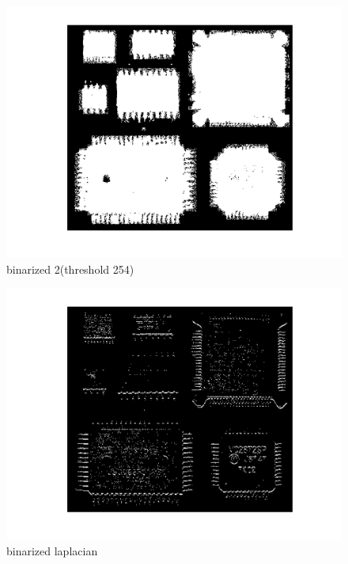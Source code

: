 \documentclass[twocolumn,oneside,a4paper]{article}
\begin{document}
\begin{figure}[htbp]
    \includegraphics[bb=0 0 576 432,width=1\columnwidth]{bw2.png}
    \caption{binarized 2(threshold 254)}
    \label{fig:bw2}
\end{figure}


\begin{figure}[htbp]
    \includegraphics[bb=0 0 576 432,width=1\columnwidth] {bw_lap.png}
    \caption{binarized laplacian}
    \label{fig:bw_lap}
\end{figure}
\end{document}
